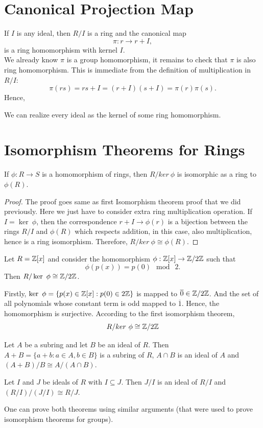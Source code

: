 \section{Canonical Projection Map}
If $I$ is any ideal, then $R/I$ is a ring and the canonical map 
\[\pi : r \rightarrow r + I,\]
is a ring homomorphism with kernel $I$.\\
We already know $\pi$ is a group homomorphism, it remains to check that $\pi$ is also ring homomorphism. This is immediate from the definition of multiplication in $R/I$:
\[\pi(rs) = rs + I = (r + I)(s + I) = \pi(r)\pi(s).\]
Hence,
\begin{theorem}
    We can realize every ideal as the kernel of some ring homomorphism.
\end{theorem}
\section{Isomorphism Theorems for Rings}
\begin{theorem}
    If $\phi: R \rightarrow S$ is a homomorphism of rings, then $R /ker \ \phi$ is isomorphic as a ring to $\phi(R)$.
\end{theorem}
\begin{proof}
    The proof goes same as first Isomorphism theorem proof that we did previously. Here we just have to consider extra ring multiplication operation. If $I = \ker \ \phi$, then the correspondence $r + I \rightarrow \phi(r)$ is a bijection between the rings $R/I$ and $\phi(R)$ which respects addition, in this case, also multiplication, hence is a ring isomorphism. Therefore, $R /ker \ \phi \cong \phi(R)$.
\end{proof}
\begin{eg}
    Let $R = \mathbb{Z}[x]$ and consider the homomorphism $\phi : \mathbb{Z}[x] \rightarrow \mathbb{Z}/2\mathbb{Z}$ such that \[\phi(p(x)) = p(0) \mod \ 2.\] Then $R/ \ker \ \phi \cong \mathbb{Z}/2\mathbb{Z}$.
\end{eg}
\begin{explanation}
    Firstly, $\ker \ \phi = \{p(x) \in \mathbb{Z}[x]: p(0) \in 2\mathbb{Z}\}$ is mapped to $\overline{0} \in \mathbb{Z}/2\mathbb{Z}$. And the set of all polynomials whose constant term is odd mapped to $\overline{1}$. Hence, the homomorphism is surjective. According to the first isomorphism theorem,
    \[R /ker \ \phi \cong \mathbb{Z}/2\mathbb{Z}\]
\end{explanation}
\begin{theorem}
    Let $A$ be a subring and let $B$ be an ideal of $R$. Then $A + B = \{a + b : a \in A, b \in B\}$ is a subring of $R$, $A \cap B$ is an ideal of $A$ and $(A + B)/B \cong A/(A \cap B)$.
\end{theorem}
\begin{theorem}
    Let $I$ and $J$ be ideals of $R$ with $I \subseteq J$. Then $J/I$ is an ideal of $R/I$ and $(R/I)/(J/I) \cong R/J$. 
\end{theorem}
One can prove both theorems using similar arguments (that were used to prove isomorphism theorems for groups).